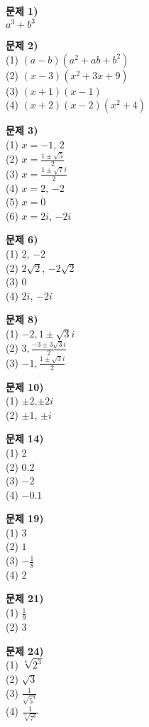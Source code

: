 \documentclass{oblivoir}
\newcommand\an[1]{\par\bigskip\noindent\textbf{문제 #1)}\\}
\begin{document}
\begin{minipage}{0.33\textwidth}
%
\an{1}
\(a^3+b^3\)

%
\an{2}
(1) \((a-b)(a^2+ab+b^2)\)\\
(2) \((x-3)(x^2+3x+9)\)\\
(3) \((x+1)(x-1)\)\\
(4) \((x+2)(x-2)(x^2+4)\)

%
\an{3}
(1) \(x=-1\), \(2\)\\
(2) \(x=\frac{1\pm\sqrt5}2\)\\
(3) \(x=\frac{1\pm\sqrt7i}2\)\\
(4) \(x=2\), \(-2\)\\
(5) \(x=0\)\\
(6) \(x=2i\), \(-2i\)

%
\an{6}
(1) \(2\), \(-2\)\\
(2) \(2\sqrt2\), \(-2\sqrt2\)\\
(3) \(0\)\\
(4) \(2i\), \(-2i\)\\

%
\an{8}
(1) \(-2,1\pm\sqrt3i\)\\
(2) \(3,\frac{-3\pm3\sqrt3i}2\)\\
(3) \(-1,\frac{1\pm\sqrt3i}2\)
\end{minipage}
\begin{minipage}{0.33\textwidth}

%
\an{10}
(1) \(\pm2\),\(\pm2i\)\\
(2) \(\pm1\), \(\pm i\)

%
\an{14}
(1) \(2\)\\
(2) \(0.2\)\\
(3) \(-2\)\\
(4) \(-0.1\)

%
\an{19}
(1) \(3\)\\
(2) \(1\)\\
(3) \(-\frac18\)\\
(4) \(2\)

%
\an{21}
(1) \(\frac19\)\\
(2) \(3\)

%
\an{24}
(1) \(\sqrt[4]{2^3}\)\\
(2) \(\sqrt{3}\)\\
(3) \(\frac1{\sqrt{5^3}}\)\\
(4) \(\frac1{\sqrt[5]{7^6}}\)
\end{minipage}
\end{document}
